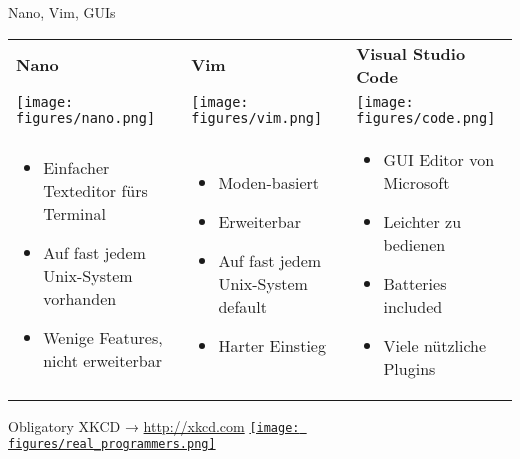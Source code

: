\begin{frame}{Nano, Vim, GUIs}
  \begin{tabu}{@{} X[,C] @{} X[,C] @{} X[,C] @{}}
    \textbf{\large Nano} & \textbf{\Large Vim} & \textbf{\Large Visual Studio Code} \\
    \texttt{[image: figures/nano.png]} &
    \texttt{[image: figures/vim.png]} &
    \texttt{[image: figures/code.png]} \\
    \begin{itemize}
      \item Einfacher Texteditor fürs Terminal
      \item Auf fast jedem Unix-System vorhanden
      \item Wenige Features, nicht erweiterbar
    \end{itemize}
    &
    \begin{itemize}
      \item Moden-basiert
      \item Erweiterbar
      \item Auf fast jedem Unix-System default
      \item Harter Einstieg
    \end{itemize}
    &
    \begin{itemize}
      \item GUI Editor von Microsoft
      \item Leichter zu bedienen
      \item Batteries included
      \item Viele nützliche Plugins
    \end{itemize}
  \end{tabu}
\end{frame}

\begin{frame}{Obligatory XKCD → \url{http://xkcd.com}}
  \centering
  \href{http://xkcd.com/378/}{\texttt{[image: figures/real\_programmers.png]}}
\end{frame}
